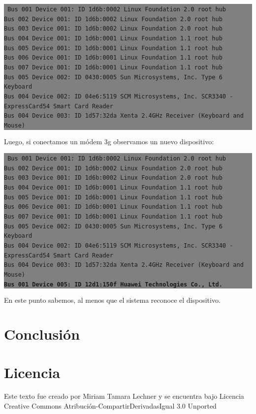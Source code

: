 \documentclass[12pt]{article}
\begin{document}
\colorbox{grey}{\parbox[t]{0.95\linewidth}{ \vspace*{0.5cm} { 
{\tt
Bus 001 Device 001: ID 1d6b:0002 Linux Foundation 2.0 root hub\\
Bus 002 Device 001: ID 1d6b:0002 Linux Foundation 2.0 root hub\\
Bus 003 Device 001: ID 1d6b:0002 Linux Foundation 2.0 root hub\\
Bus 004 Device 001: ID 1d6b:0001 Linux Foundation 1.1 root hub\\
Bus 005 Device 001: ID 1d6b:0001 Linux Foundation 1.1 root hub\\
Bus 006 Device 001: ID 1d6b:0001 Linux Foundation 1.1 root hub\\
Bus 007 Device 001: ID 1d6b:0001 Linux Foundation 1.1 root hub\\
Bus 005 Device 002: ID 0430:0005 Sun Microsystems, Inc. Type 6 Keyboard\\
Bus 004 Device 002: ID 04e6:5119 SCM Microsystems, Inc. SCR3340 - ExpressCard54 Smart Card Reader\\
Bus 004 Device 003: ID 1d57:32da Xenta 2.4GHz Receiver (Keyboard and Mouse)
}
} \vspace*{0.5cm} } } 

Luego, si conectamos un módem 3g observamos un nuevo dispositivo: 

\colorbox{grey}{\parbox[t]{0.95\linewidth}{ \vspace*{0.5cm} { 
{\tt
Bus 001 Device 001: ID 1d6b:0002 Linux Foundation 2.0 root hub\\
Bus 002 Device 001: ID 1d6b:0002 Linux Foundation 2.0 root hub\\
Bus 003 Device 001: ID 1d6b:0002 Linux Foundation 2.0 root hub\\
Bus 004 Device 001: ID 1d6b:0001 Linux Foundation 1.1 root hub\\
Bus 005 Device 001: ID 1d6b:0001 Linux Foundation 1.1 root hub\\
Bus 006 Device 001: ID 1d6b:0001 Linux Foundation 1.1 root hub\\
Bus 007 Device 001: ID 1d6b:0001 Linux Foundation 1.1 root hub\\
Bus 005 Device 002: ID 0430:0005 Sun Microsystems, Inc. Type 6 Keyboard\\
Bus 004 Device 002: ID 04e6:5119 SCM Microsystems, Inc. SCR3340 - ExpressCard54 Smart Card Reader\\
Bus 004 Device 003: ID 1d57:32da Xenta 2.4GHz Receiver (Keyboard and Mouse)\\
\textbf{Bus 001 Device 005: ID 12d1:150f Huawei Technologies Co., Ltd.}
}
} \vspace*{0.5cm} } } 

En este punto sabemos, al menos que el sistema reconoce el dispositivo. 

\section{Conclusión}


\section*{Licencia}

Este texto fue creado por Miriam Tamara Lechner y se encuentra bajo 
Licencia Creative Commons Atribución-CompartirDerivadasIgual 3.0 Unported
\end{document}
